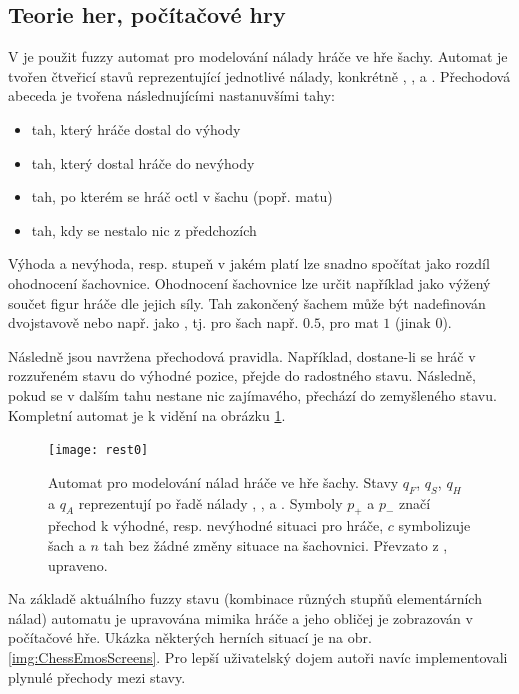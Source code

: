 \documentclass[a4paper,10pt]{article}
\begin{document}
\subsection{Teorie her, počítačové hry}
V \cite{AlvJoaCru-FuStMaAppEmoModEleGamCha} je použit fuzzy automat pro modelování nálady hráče ve hře šachy. Automat je tvořen čtveřicí stavů reprezentující jednotlivé  nálady, konkrétně , ,  a . Přechodová abeceda je tvořena následnujícími nastanuvšími tahy:
\begin{itemize}
 \item tah, který hráče dostal do výhody
 \item tah, který dostal hráče do nevýhody
 \item tah, po kterém se hráč octl v šachu (popř. matu)
 \item tah, kdy se nestalo nic z předchozích
\end{itemize}
Výhoda a nevýhoda, resp. stupeň v jakém platí  lze snadno spočítat jako rozdíl ohodnocení šachovnice. Ohodnocení šachovnice lze určit například jako výžený součet figur hráče dle jejich síly. Tah zakončený šachem může být nadefinován dvojstavově nebo např. jako , tj. pro šach např. $0.5$, pro mat $1$ (jinak $0$).

Následně jsou navržena přechodová pravidla. Například, dostane-li se hráč v rozzuřeném stavu do výhodné pozice, přejde do radostného stavu.  Následně, pokud se v dalším tahu nestane nic zajímavého, přechází do zemyšleného stavu. Kompletní automat je k vidění na obrázku \ref{img:ChessEmosFA}.

\begin{figure}
 \centering
 \texttt{[image: rest0]}
 
 \caption{Automat pro modelování nálad hráče ve hře šachy. Stavy $q_F$, $q_S$, $q_H$ a $q_A$ reprezentují po řadě nálady , ,  a . Symboly $p_{+}$ a $p_{-}$ značí přechod k výhodné, resp. nevýhodné situaci pro hráče, $c$ symbolizuje šach a $n$ tah bez žádné změny situace na šachovnici. Převzato z \cite{AlvJoaCru-FuStMaAppEmoModEleGamCha}, upraveno.}
 \label{img:ChessEmosFA}
\end{figure}

Na základě aktuálního fuzzy stavu (kombinace různých stupňů elementárních nálad) automatu je upravována mimika hráče a jeho obličej je zobrazován v počítačové hře. Ukázka některých herních situací je na obr. \ref{img:ChessEmosScreens}. Pro lepší uživatelský dojem autoři navíc implementovali plynulé přechody mezi stavy.
\end{document}
